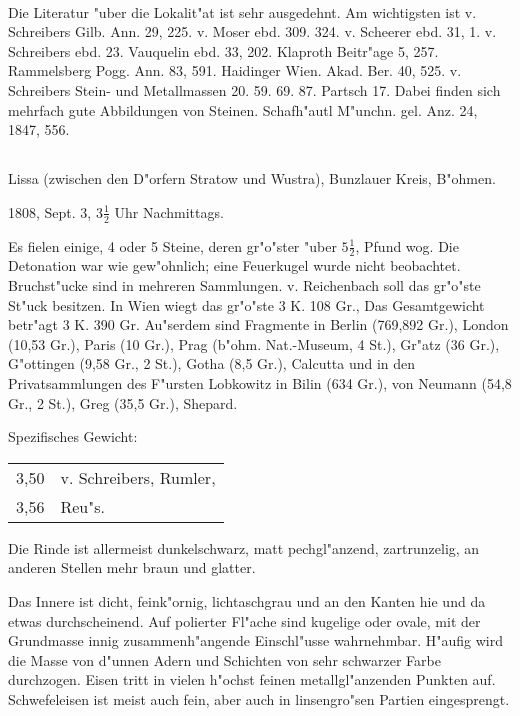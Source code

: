 \documentclass[a4paper, 11pt, oneside]{article}
\begin{document}
\paragraph{}
Die Literatur "uber die Lokalit"at ist sehr ausgedehnt. Am wichtigsten ist v. Schreibers Gilb. Ann. 29, 225. v. Moser ebd. 309. 324. v. Scheerer ebd. 31, 1. v. Schreibers ebd. 23. Vauquelin ebd. 33, 202. Klaproth Beitr"age 5, 257. Rammelsberg Pogg. Ann. 83, 591. Haidinger Wien. Akad. Ber. 40, 525. v. Schreibers Stein- und Metallmassen 20. 59. 69. 87. Partsch 17. Dabei finden sich mehrfach gute Abbildungen von Steinen. Schafh"autl M"unchn. gel. Anz. 24, 1847, 556.
\subsection{}
\LARGE
\paragraph{}
Lissa (zwischen den D"orfern Stratow und Wustra), Bunzlauer Kreis, B"ohmen.

1808, Sept. 3, $\mathfrak{3\frac{1}{2}}$ Uhr Nachmittags.

Es fielen einige, 4 oder 5 Steine, deren gr"o"ster "uber $\mathfrak{5\frac{1}{2}}$, Pfund wog. Die Detonation war wie gew"ohnlich; eine Feuerkugel wurde nicht beobachtet. Bruchst"ucke sind in mehreren Sammlungen. v. Reichenbach soll das gr"o"ste St"uck besitzen. In Wien wiegt das gr"o"ste 3 K. 108 Gr., Das Gesamtgewicht betr"agt 3 K. 390 Gr. Au"serdem sind Fragmente in Berlin (769,892 Gr.), London (10,53 Gr.), Paris (10 Gr.), Prag (b"ohm. Nat.-Museum, 4 St.), Gr"atz (36 Gr.), G"ottingen (9,58 Gr., 2 St.), Gotha (8,5 Gr.), Calcutta und in den Privatsammlungen des F"ursten Lobkowitz in Bilin (634 Gr.), von Neumann (54,8 Gr., 2 St.), Greg (35,5 Gr.), Shepard.

Spezifisches Gewicht:
\begin{table}[!ht]
    \centering\swabfamily\Large
    \begin{tabular}{l l}
        3,50 & v. Schreibers, Rumler,\\
        3,56 & Reu"s.
    \end{tabular}
\end{table}

Die Rinde ist allermeist dunkelschwarz, matt pechgl"anzend, zartrunzelig, an anderen Stellen mehr braun und glatter.

Das Innere ist dicht, feink"ornig, lichtaschgrau und an den Kanten hie und da etwas durchscheinend. Auf polierter Fl"ache sind kugelige oder ovale, mit der Grundmasse innig zusammenh"angende Einschl"usse wahrnehmbar. H"aufig wird die Masse von d"unnen Adern und Schichten von sehr schwarzer Farbe durchzogen. Eisen tritt in vielen h"ochst feinen metallgl"anzenden Punkten auf. Schwefeleisen ist meist auch fein, aber auch in linsengro"sen Partien eingesprengt.
\end{document}
